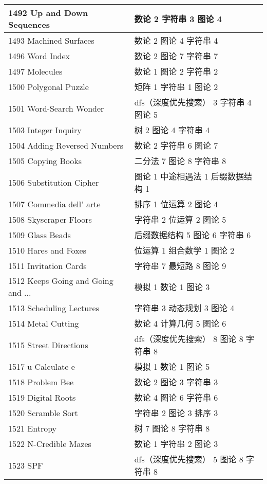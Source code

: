 \begin{longtable}{| p{} | p{} |}
 1492 Up and Down Sequences  & 数论 2 字符串 3 图论 4 \\ \hline
 1493 Machined Surfaces  & 数论 2 图论 4 字符串 4 \\ \hline
 1496 Word Index  & 数论 2 图论 7 字符串 7 \\ \hline
 1497 Molecules  & 数论 1 图论 2 字符串 2 \\ \hline
 1500 Polygonal Puzzle  & 矩阵 1 字符串 1 图论 2 \\ \hline
 1501 Word-Search Wonder  & dfs（深度优先搜索） 3 字符串 4 图论 5 \\ \hline
 1503 Integer Inquiry  & 树 2 图论 4 字符串 4 \\ \hline
 1504 Adding Reversed Numbers  & 数论 2 字符串 6 图论 7 \\ \hline
 1505 Copying Books  & 二分法 7 图论 8 字符串 8 \\ \hline
 1506 Substitution Cipher  & 图论 1 中途相遇法 1 后缀数据结构 1 \\ \hline
 1507 Commedia dell' arte  & 排序 1 位运算 2 图论 4 \\ \hline
 1508 Skyscraper Floors  & 字符串 2 位运算 2 图论 5 \\ \hline
 1509 Glass Beads  & 后缀数据结构 5 图论 6 字符串 6 \\ \hline
 1510 Hares and Foxes  & 位运算 1 组合数学 1 图论 2 \\ \hline
 1511 Invitation Cards  & 字符串 7 最短路 8 图论 9 \\ \hline
 1512 Keeps Going and Going and ...  & 模拟 1 数论 1 图论 3 \\ \hline
 1513 Scheduling Lectures  & 字符串 3 动态规划 3 图论 4 \\ \hline
 1514 Metal Cutting  & 数论 4 计算几何 5 图论 6 \\ \hline
 1515 Street Directions  & dfs（深度优先搜索） 8 图论 8 字符串 8 \\ \hline
 1517 u Calculate e  & 模拟 1 数论 1 图论 5 \\ \hline
 1518 Problem Bee  & 数论 2 图论 3 字符串 3 \\ \hline
 1519 Digital Roots  & 数论 4 图论 6 字符串 6 \\ \hline
 1520 Scramble Sort  & 字符串 2 图论 3 排序 3 \\ \hline
 1521 Entropy  & 树 7 图论 8 字符串 8 \\ \hline
 1522 N-Credible Mazes  & 数论 1 字符串 2 图论 3 \\ \hline
 1523 SPF  & dfs（深度优先搜索） 5 图论 8 字符串 8 \\ \hline

\end{longtable}
